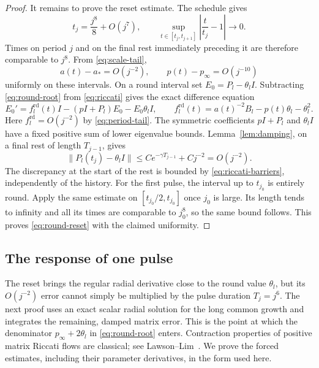 \begin{proof}
It remains to prove the reset estimate.  The schedule gives
\begin{equation}
 t_j=\frac{j^8}{8}+O(j^7),\qquad
 \sup_{t\in[t_j,t_{j+1}]}\left|\frac{t}{t_j}-1\right|\longrightarrow0.
 \label{eq:time-asymptotic}
\end{equation}
Times on period \(j\) and on the final rest immediately preceding
it are therefore comparable to \(j^8\).  From
\eqref{eq:scale-tail},
\begin{equation}
 a(t)-a_*=O(j^{-2}),\qquad p(t)-p_\infty=O(j^{-10})
 \label{eq:period-tail}
\end{equation}
uniformly on these intervals.  On a round interval set
\(E_0=P_l-\theta_l I\).  Subtracting \eqref{eq:round-root} from
\eqref{eq:riccati} gives the exact difference equation
\[
 E_0'=f_l^{\mathrm{rd}}(t)I-(pI+P_l)E_0-E_0\theta_l I,\qquad
 f_l^{\mathrm{rd}}(t)=a(t)^{-2}B_l-p(t)\theta_l-\theta_l^2.
\]
Here \(f_l^{\mathrm{rd}}=O(j^{-2})\) by \eqref{eq:period-tail}.  The symmetric
coefficients \(pI+P_l\) and \(\theta_l I\) have a fixed positive
sum of lower eigenvalue bounds.  Lemma~\ref{lem:damping}, on a final
rest of length \(T_{j-1}\), gives
\[
 \|P_l(t_j)-\theta_lI\|
 \leq C e^{-\gamma T_{j-1}}+Cj^{-2}=O(j^{-2}).
\]
The discrepancy at the start of the rest is bounded by
\eqref{eq:riccati-barriers}, independently of the history.  For the
first pulse, the interval up to \(t_{j_0}\) is entirely round.
Apply the same estimate on
\([t_{j_0}/2,t_{j_0}]\) once \(j_0\) is large.  Its length tends
to infinity and all its times are comparable to \(j_0^8\), so the
same bound follows.  This proves \eqref{eq:round-reset} with the
claimed uniformity.
\end{proof}

\subsection{The response of one pulse}
\label{subsec:pulse}

The reset brings the regular radial derivative close to the
round value \(\theta_l\), but its \(O(j^{-2})\) error cannot simply
be multiplied by the pulse duration \(T_j=j^6\).  The next proof
uses an exact scalar radial solution for the long common growth
and integrates the remaining, damped matrix error.  This is the
point at which the denominator \(p_\infty+2\theta_l\) in
\eqref{eq:round-root} enters.  Contraction properties of positive
matrix Riccati flows are classical; see Lawson--Lim~\cite[Theorem~8.5]{LawsonLim}.
We prove the forced estimates, including their parameter
derivatives, in the form used here.

